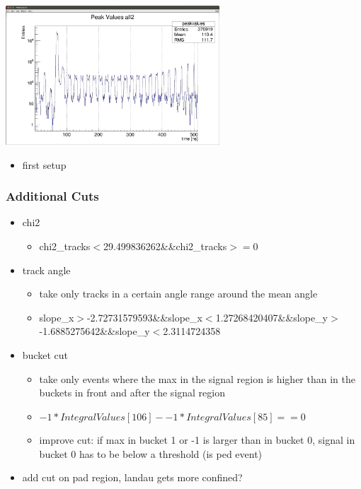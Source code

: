 \documentclass[9pt]{beamer}
\begin{document}
\begin{frame}
	\begin{center}
		\includegraphics[width=8cm]{Pics/peakvalues}
	\end{center}
	\begin{itemize}
		\item first setup
	\end{itemize}
\end{frame}
\begin{frame}
	\frametitle{Additional Cuts}
	\begin{itemize}
		\item chi2
		\begin{itemize}
			\item chi2\_tracks$<$29.499836262\&\&chi2\_tracks$>=$0
		\end{itemize}
		\item track angle
		\begin{itemize}
			\item take only tracks in a certain angle range around the mean angle
			\item slope\_x$>$-2.72731579593\&\&slope\_x$<$1.27268420407\&\&slope\_y$>$-1.6885275642\&\&slope\_y$<$2.3114724358
		\end{itemize}
		\item bucket cut 
		\begin{itemize}
			\item take only events where the max in the signal region is higher than in the buckets in front and after the signal region
			\item $-1*IntegralValues[106]--1*IntegralValues[85]==0$
			\item improve cut: if max in bucket 1 or -1 is larger than in bucket 0, signal in bucket 0 has to be below a threshold (is ped event)
		\end{itemize}
		\item add cut on pad region, landau gets more confined?
	\end{itemize}
\end{frame}
\end{document}
